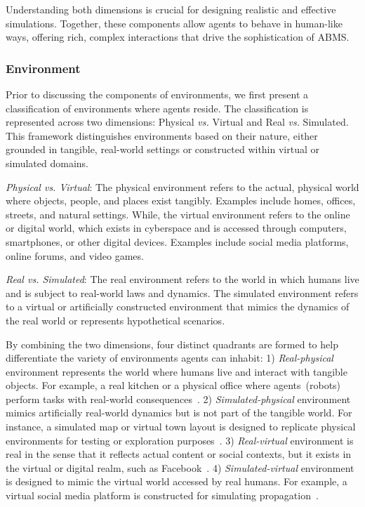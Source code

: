 Understanding both dimensions is crucial for designing realistic and effective simulations.
Together, these components allow agents to behave in human-like ways, offering rich, complex interactions that drive the sophistication of ABMS.
   
\subsubsection{Environment}
Prior to discussing the components of environments, we first present a classification of environments where agents reside.
The classification is represented across two dimensions: Physical \textit{vs.} Virtual and Real \textit{vs.} Simulated. 
This framework distinguishes environments based on their nature, either grounded in tangible, real-world settings or constructed within virtual or simulated domains.

\textit{Physical vs. Virtual}: The physical environment refers to the actual, physical world where objects, people, and places exist tangibly. 
Examples include homes, offices, streets, and natural settings.
While, the virtual environment refers to the online or digital world, which exists in cyberspace and is accessed through computers, smartphones, or other digital devices.
Examples include social media platforms, online forums, and video games.

\textit{Real vs. Simulated}:
The real environment refers to the world in which humans live and is subject to real-world laws and dynamics.
The simulated environment refers to a virtual or artificially constructed environment that mimics the dynamics of the real world or represents hypothetical scenarios.

By combining the two dimensions, four distinct quadrants are formed to help differentiate the variety of environments agents can inhabit: 
1) \textit{Real-physical} environment represents the world where humans live and interact with tangible objects.
For example, a real kitchen or a physical office where agents~(robots) perform tasks with real-world consequences~\cite{ren2023robotsaskhelpuncertainty}.
2) \textit{Simulated-physical} environment mimics artificially real-world dynamics but is not part of the tangible world.
For instance, a simulated map or virtual town layout is designed to replicate physical environments for testing or exploration purposes~\cite{Cui_2024_WACV}.
3) \textit{Real-virtual} environment is real in the sense that it reflects actual content or social contexts, but it exists in the virtual or digital realm, such as Facebook~\cite{noauthor_meta_nodate}. 
4) \textit{Simulated-virtual} environment is designed to mimic the virtual world accessed by real humans.  
For example, a virtual social media platform is constructed for simulating propagation~\cite{10.1145/3526113.3545616}.

